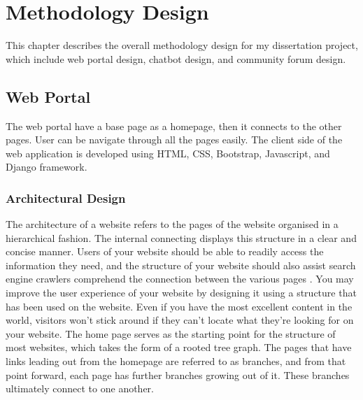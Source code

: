 \def\baselinestretch{1}

\chapter{Methodology Design}

\def\baselinestretch{1.44}


This chapter describes the overall methodology design for my dissertation project, which include web portal design, chatbot design, and community forum design. 
   
\smallskip

\goodbreak
\section{Web Portal}
The web portal have a base page as a homepage, then it connects to the other pages. User can be navigate through all the pages easily. The client side of the web application is developed using HTML, CSS, Bootstrap, Javascript, and Django framework. 

\subsection{Architectural Design}
The architecture of a website refers to the pages of the website organised in a hierarchical fashion. The internal connecting displays this structure in a clear and concise manner. Users of your website should be able to readily access the information they need, and the structure of your website should also assist search engine crawlers comprehend the connection between the various pages \citep{web}. You may improve the user experience of your website by designing it using a structure that has been used on the website. Even if you have the most excellent content in the world, visitors won't stick around if they can't locate what they're looking for on your website. The home page serves as the starting point for the structure of most websites, which takes the form of a rooted tree graph. The pages that have links leading out from the homepage are referred to as branches, and from that point forward, each page has further branches growing out of it. These branches ultimately connect to one another. 

